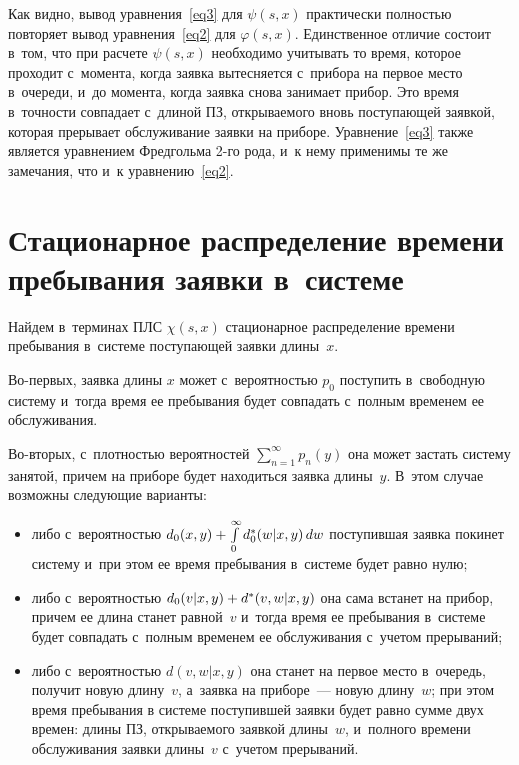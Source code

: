 \begin{multicols}{2}
Как видно, вывод уравнения~\eqref{eq3} для $\psi(s,x)$ практически полностью повторяет вывод уравнения~\eqref{eq2} для $\varphi(s,x)$. Единственное отличие состоит в~том, что при расчете $\psi(s,x)$
необходимо учитывать то время, которое проходит с~момента, когда заявка вытесняется с~прибора на первое место в~очереди, и~до момента, когда заявка снова занимает прибор. Это время в~точности совпадает с~длиной ПЗ, открываемого вновь поступающей заявкой, которая прерывает обслуживание заявки на приборе.
Уравнение~\eqref{eq3} также является уравнением Фредгольма 2-го рода, и~к нему применимы те же замечания, что и~к уравнению~\eqref{eq2}.

\section{Стационарное распределение времени пребывания заявки в~системе}


Найдем в~терминах ПЛС $\chi(s,x)$ стационарное распределение времени пребывания в~системе поступающей заявки длины~$x$.

Во-первых, заявка длины $x$ может с~вероят\-ностью $p_0$ поступить в~свободную систему и~тогда время ее пребывания будет совпадать с~полным временем ее обслуживания.

Во-вторых, с~плот\-ностью вероятностей $\sum\nolimits_{n=1}^\infty p_n(y)$ она может застать систему занятой, причем на приборе будет находиться заявка длины~$y$.
В~этом случае возможны следующие вари\-анты:
\begin{itemize}
 \item либо с~вероятностью $d_0(x,y)\hm+\int\limits_0^\infty d_0^*(w|x,y)\,dw$ поступившая заявка покинет систему и~при этом ее время пребывания в~сис\-те\-ме будет равно нулю;

\item  либо с~вероятностью $d_0(v|x,y)\hm+d^*(v,w|x,y)$ она сама встанет на прибор, причем ее длина станет равной~$v$ и~тогда время ее пребывания в~сис\-те\-ме будет совпадать с~полным временем ее обслуживания с~учетом прерываний;

\item  либо с~вероятностью $d(v,w|x,y)$ она станет на первое место в~очередь, получит новую длину~$v$, а~заявка на приборе~--- новую длину~$w$; при этом время пребывания в системе поступившей заявки будет равно сумме двух времен: длины ПЗ, открываемого заявкой длины~$w$, и~полного времени обслуживания заявки длины~$v$ с~учетом прерываний.
    \end{itemize}


\end{multicols}
